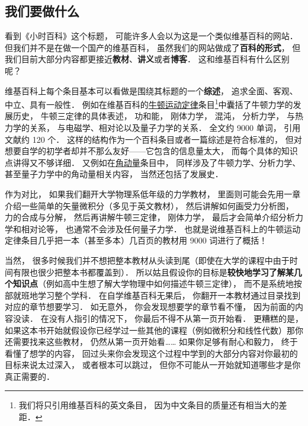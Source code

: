 
\subsection{我们要做什么}

看到《小时百科》这个标题， 可能许多人会以为这是一个类似维基百科的网站． 但我们并不是在做一个国产的维基百科， 虽然我们的网站做成了\textbf{百科的形式}， 但我们目前大部分内容都更接近\textbf{教材}、\textbf{讲义}或者\textbf{博客}． 这和维基百科有什么区别呢？

维基百科上每个条目基本可以看做是围绕其标题的一个\textbf{综述}， 追求全面、客观、中立、具有一般性． 例如在维基百科的\href{https://en.wikipedia.org/wiki/Newton's_laws_of_motion}{牛顿运动定律}条目\footnote{我们将只引用维基百科的英文条目， 因为中文条目的质量还有相当大的差距．}中囊括了牛顿力学的发展历史， 牛顿三定律的具体表述， 功和能， 刚体力学， 混沌， 分析力学， 与热力学的关系， 与电磁学、相对论以及量子力学的关系． 全文约 9000 单词， 引用文献约 120 个． 这样的结构作为一个百科条目或者一篇综述是符合标准的， 但对想要自学的初学者却并不那么友好——它包含的信息量太大， 而每个具体的知识点讲得又不够详细． 又例如在\href{https://en.wikipedia.org/wiki/Angular_momentum}{角动量}条目中， 同样涉及了牛顿力学、分析力学、甚至量子力学中的角动量相关内容， 当然还包括了发展史．

作为对比， 如果我们翻开大学物理系低年级的力学教材， 里面则可能会先用一章介绍一些简单的矢量微积分（多见于英文教材）， 然后讲解如何画受力分析图， 力的合成与分解， 然后再讲解牛顿三定律， 刚体力学， 最后才会简单介绍分析力学和相对论等， 也通常不会涉及任何量子力学． 也就是说维基百科上的牛顿运动定律条目几乎把一本（甚至多本）几百页的教材用 9000 词进行了概括！

当然， 很多时候我们并不想把整本教材从头读到尾（即使在大学的课程中由于时间有限也很少把整本书都覆盖到）． 所以姑且假设你的目标是\textbf{较快地学习了解某几个知识点}（例如高中生想了解大学物理中如何描述牛顿三定律）， 而不是系统地按部就班地学习整个学科． 在自学维基百科无果后， 你翻开一本教材通过目录找到对应的章节想要学习． 如无意外， 你会发现想要学的章节看不懂， 因为前面的内容没读． 在没有人指引的情况下， 你最后不得不从第一页开始看． 更糟糕的是， 如果这本书开始就假设你已经学过一些其他的课程（例如微积分和线性代数）那你还需要找来这些教材， 仍然从第一页开始看…… 如果你足够有耐心和毅力， 终于看懂了想学的内容， 回过头来你会发现这个过程中学到的大部分内容对你最初的目标来说太过深入， 或者根本可以跳过， 但你不可能从一开始就知道哪些才是你真正需要的．

